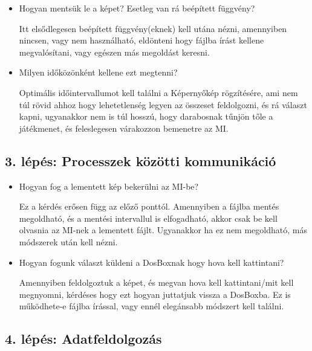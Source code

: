 \begin{itemize}
    \item Hogyan mentsük le a képet? Esetleg van rá beépített függvény?
    
    Itt elsődlegesen beépített függvény(eknek) kell utána nézni, amennyiben nincsen, vagy nem használható, eldönteni hogy fájlba írást kellene megvalósítani, vagy egészen más megoldást keresni.
    \item Milyen időközönként kellene ezt megtenni?
    
    Optimális időintervallumot kell találni a Képernyőkép rögzítésére, ami nem túl rövid ahhoz hogy lehetetlenség legyen az összeset feldolgozni, és rá választ kapni, ugyanakkor nem is túl hosszú, hogy darabosnak tűnjön tőle a játékmenet, és feleslegesen várakozzon bemenetre az MI.
\end{itemize}

\subsection{3. lépés: Processzek közötti kommunikáció}

\begin{itemize}
    \item Hogyan fog a lementett kép bekerülni az MI-be?
    
    Ez a kérdés erősen függ az előző ponttól. Amennyiben a fájlba mentés megoldható, és a mentési intervallul is elfogadható, akkor csak be kell olvasnia az MI-nek a lementett fájlt. Ugyanakkor ha ez nem megoldható, más módszerek után kell nézni.  
    
    \item Hogyan fogunk választ küldeni a DosBoxnak hogy hova kell kattintani?
    
    Amennyiben feldolgoztuk a képet, és megvan hova kell kattintani/mit kell megnyomni, kérdéses hogy ezt hogyan juttatjuk vissza a DosBoxba. Ez is működhete-e fájlba írással, vagy ennél elegánsabb módszert kell találni.  

\end{itemize}


\subsection{4. lépés: Adatfeldolgozás}

